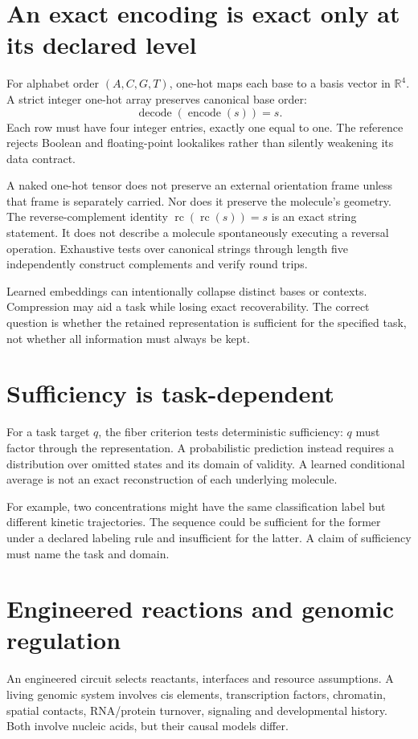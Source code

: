 \section{An exact encoding is exact only at its declared level}
For alphabet order $(A,C,G,T)$, one-hot maps each base to a basis vector in
$\mathbb R^4$. A strict integer one-hot array preserves canonical base order:
\[
 \operatorname{decode}(\operatorname{encode}(s))=s.
\]
Each row must have four integer entries, exactly one equal to one.
The reference rejects Boolean and floating-point lookalikes rather than
silently weakening its data contract.

A naked one-hot tensor does not preserve an external orientation frame unless
that frame is separately carried. Nor does it preserve the molecule's geometry.
The reverse-complement identity $\operatorname{rc}(\operatorname{rc}(s))=s$
is an exact string statement. It does not describe a molecule spontaneously
executing a reversal operation. Exhaustive tests over canonical strings through
length five independently construct complements and verify round trips.

Learned embeddings can intentionally collapse distinct bases or contexts.
Compression may aid a task while losing exact recoverability. The correct
question is whether the retained representation is sufficient for the specified
task, not whether all information must always be kept.

\section{Sufficiency is task-dependent}
For a task target $q$, the fiber criterion tests deterministic sufficiency:
$q$ must factor through the representation. A probabilistic prediction instead
requires a distribution over omitted states and its domain of validity.
A learned conditional average is not an exact reconstruction of each underlying
molecule.

For example, two concentrations might have the same classification label but
different kinetic trajectories. The sequence could be sufficient for the former
under a declared labeling rule and insufficient for the latter. A claim of
sufficiency must name the task and domain.

\section{Engineered reactions and genomic regulation}
An engineered circuit selects reactants, interfaces and resource assumptions.
A living genomic system involves cis elements, transcription factors, chromatin,
spatial contacts, RNA/protein turnover, signaling and developmental history.
Both involve nucleic acids, but their causal models differ.

